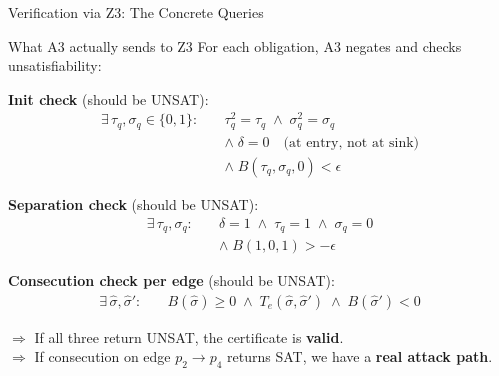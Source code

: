 \documentclass[aspectratio=169]{beamer}
\begin{document}
\begin{frame}{Verification via Z3: The Concrete Queries}
\begin{block}{What A3 actually sends to Z3}
For each obligation, A3 negates and checks unsatisfiability:
\end{block}

\vspace{0.3em}
\footnotesize
\textbf{Init check} (should be UNSAT):
\begin{align*}
  \exists\, \tau_q, \sigma_q \in \{0,1\}:\quad
  & \tau_q^2 = \tau_q \;\wedge\; \sigma_q^2 = \sigma_q \\
  & \wedge\; \delta = 0 \quad\text{(at entry, not at sink)}\\
  & \wedge\; B(\tau_q, \sigma_q, 0) < \epsilon
\end{align*}

\textbf{Separation check} (should be UNSAT):
\begin{align*}
  \exists\, \tau_q, \sigma_q:\quad
  & \delta = 1 \;\wedge\; \tau_q = 1 \;\wedge\; \sigma_q = 0 \\
  & \wedge\; B(1, 0, 1) > -\epsilon
\end{align*}

\textbf{Consecution check per edge} (should be UNSAT):
\begin{align*}
  \exists\, \hat\sigma, \hat\sigma':\quad
  & B(\hat\sigma) \ge 0 \;\wedge\; T_e(\hat\sigma, \hat\sigma') \;\wedge\; B(\hat\sigma') < 0
\end{align*}

\normalsize
\vspace{0.3em}
$\Rightarrow$ If all three return UNSAT, the certificate is \textbf{valid}. \\
$\Rightarrow$ If consecution on edge $p_2 \to p_4$ returns SAT, we have a \textbf{real attack path}.
\end{frame}


\end{document}
